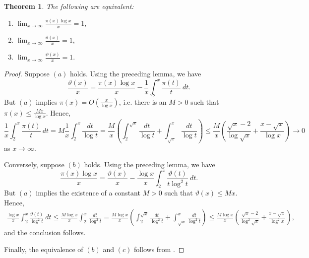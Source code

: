 \documentclass[12pt]{article}
\theoremstyle{thmstyle}
\newtheorem{theorem}{Theorem}[section]
\theoremstyle{defstyle}
\renewcommand{\le}{\leqslant}
\begin{document}
\begin{theorem}
    The following are equivalent: 
    \begin{enumerate}[label=(\alph*)]
        \item $\displaystyle\lim_{x\to\infty}\frac{\pi(x)\log x}{x} = 1,$
        \item $\displaystyle\lim_{x\to\infty}\frac{\vartheta(x)}{x} = 1,$
        \item $\displaystyle\lim_{x\to\infty}\frac{\psi(x)}{x} = 1.$
    \end{enumerate}
\end{theorem}
\begin{proof}
    Suppose $(a)$ holds. Using the preceding lemma, we have 
    \begin{equation*}
        \frac{\vartheta(x)}{x} = \frac{\pi(x)\log x}{x} - \frac{1}{x}\int_2^x\frac{\pi(t)}{t}~dt.
    \end{equation*}
    But $(a)$ implies $\pi(x) = O\left(\frac{x}{\log x}\right)$, i.e. there is an $M > 0$ such that $\pi(x)\le\frac{Mx}{\log x}$. Hence, 
    \begin{equation*}
        \frac{1}{x}\int_2^x\frac{\pi(t)}{t}~dt = M\frac{1}{x}\int_2^x\frac{dt}{\log t} = \frac{M}{x}\left(\int_2^{\sqrt x}\frac{dt}{\log t} + \int_{\sqrt x}^x\frac{dt}{\log t}\right)\le\frac{M}{x}\left(\frac{\sqrt x - 2}{\log\sqrt x} + \frac{x - \sqrt x}{\log x}\right)\to 0
    \end{equation*}
    as $x\to\infty$.

    Conversely, suppose $(b)$ holds. Using the preceding lemma, we have 
    \begin{equation*}
        \frac{\pi(x)\log x}{x} = \frac{\vartheta(x)}{x} - \frac{\log x}{x}\int_2^x\frac{\vartheta(t)}{t\log^2 t}~dt.
    \end{equation*}
    But $(a)$ implies the existence of a constant $M > 0$ such that $\vartheta(x)\le Mx$. Hence, 
    \begin{align*}
        \frac{\log x}{x}\int_2^x\frac{\vartheta(t)}{\log^2 t}~dt\le\frac{M\log x}{x}\int_2^x\frac{dt}{\log^2 t} = \frac{M\log x}{x}\left(\int_2^{\sqrt x}\frac{dt}{\log^2 t} + \int_{\sqrt x}^x\frac{dt}{\log^2 t}\right)\le\frac{M\log x}{x}\left(\frac{\sqrt x - 2}{\log^2\sqrt x} + \frac{x - \sqrt x}{\log^2 x}\right),
    \end{align*}
    and the conclusion follows.

    Finally, the equivalence of $(b)$ and $(c)$ follows from .
\end{proof}
\end{document}
